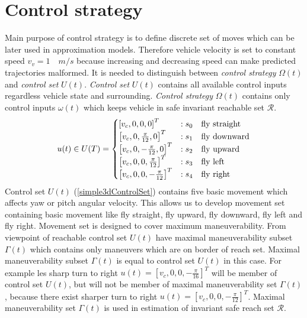 \section{Control strategy}\label{sec:3DcontrolSimplisticStrategy}
\noindent Main purpose of control strategy is to define discrete set of moves which can be later used in approximation models. Therefore vehicle velocity is set to constant speed $v_v = 1\quad m/s$ because increasing and decreasing speed can make predicted trajectories malformed. It is needed to distinguish between \textit{control strategy} $\Omega(t)$ and \textit{control set} $U(t)$. \textit{Control set} $U(t)$ contains all available control inputs regardless vehicle state and surrounding. \textit{Control strategy} $\Omega(t)$ contains only control inputs $\omega(t)$ which keeps vehicle in safe invariant reachable set $\mathscr{R}$.
\begin{equation}\label{simple3dControlSet}
    u(t)\in U(T) =
    \begin{cases}
        \left [ v_c,0,0,0 \right ]^T & :s_0 \quad\textnormal{fly straight} \\
        \left [ v_c,0,\frac{\pi}{12},0 \right ]^T & :s_1 \quad\textnormal{fly downward} \\
        \left [ v_c,0,-\frac{\pi}{12},0 \right ]^T & :s_2 \quad\textnormal{fly upward} \\
        \left [ v_c,0,0,\frac{\pi}{12} \right ]^T & :s_3 \quad\textnormal{fly left} \\
        \left [ v_c,0,0,-\frac{\pi}{12} \right ]^T & :s_4 \quad\textnormal{fly right} 
    \end{cases}
\end{equation}
Control set $U(t)$ (\ref{simple3dControlSet}) contains five basic movement which affects yaw or pitch angular velocity. This allows us to develop movement set containing basic movement like fly straight, fly upward, fly downward, fly left and fly right. Movement set  is designed to cover maximum maneuverability. From viewpoint of reachable control set $U(t)$ have maximal maneuverability subset $\Gamma(t)$ which contains only maneuvers which are on border of reach set. Maximal maneuverability subset $\Gamma(t)$ is equal to control set $U(t)$ in this case. For example les sharp turn to right $u(t)=\left [ v_c,0,0,-\frac{\pi}{16} \right ]^T$ will be member of control set $U(t)$, but will not be member of maximal maneuverability set $\Gamma(t)$, because there exist sharper turn to right $u(t) = \left [ v_c,0,0,-\frac{\pi}{12} \right ]^T $. Maximal maneuverability set $\Gamma(t)$ is used in estimation of invariant safe reach set $\mathscr{R}$.

